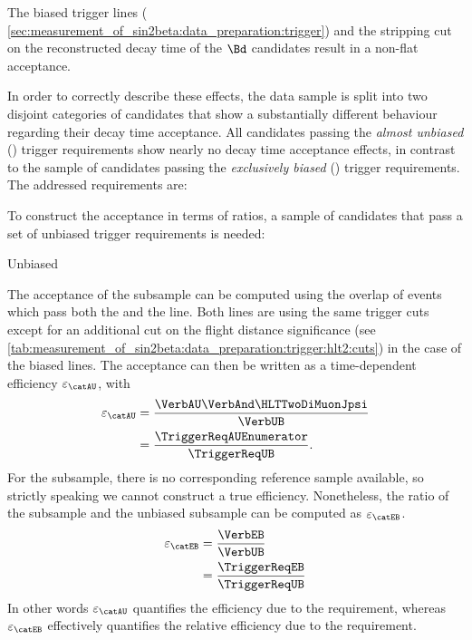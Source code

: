 The biased trigger lines (\cf
\cref{sec:measurement_of_sin2beta:data_preparation:trigger}) and the stripping
cut on the reconstructed decay time of the $\Bd$ candidates result in a non-flat
acceptance.

In order to correctly describe these effects, the data sample is split into two
disjoint categories of candidates that show a substantially different behaviour
regarding their decay time acceptance. All candidates passing the \emph{almost
unbiased} (\textbf{\catAU}) trigger requirements show nearly no decay time
acceptance effects, in contrast to the sample of candidates passing the
\emph{exclusively biased} (\textbf{\catEB}) trigger requirements. The addressed
requirements are:
%
\begin{description}
  \item[\catAU] \TriggerReqAU
  \item[\catEB] \TriggerReqEB
\end{description}
%
To construct the acceptance in terms of ratios, a sample of candidates that pass
a set of unbiased trigger requirements is needed:
%
\begin{description}
  \item[Unbiased] \TriggerReqUB
\end{description}
%
The acceptance of the \catAU subsample can be computed using the overlap of events
which pass both the \HLTTwoDiMuonDetachedJpsi and the
\HLTTwoDiMuonJpsi line. Both lines are using the same trigger cuts except for
an additional cut on the flight distance significance (see
\cref{tab:measurement_of_sin2beta:data_preparation:trigger:hlt2:cuts}) in the
case of the biased lines. The acceptance can then be written as a time-dependent
efficiency $\varepsilon_\text{\catAU}$, with
%
\begin{equation}
  \begin{split}
    \varepsilon_\text{\catAU} &= \frac{\VerbAU \VerbAnd \HLTTwoDiMuonJpsi}{\VerbUB}\\
                              &= \frac{\TriggerReqAUEnumerator}{\TriggerReqUB}.
  \end{split}
\end{equation} 
%
For the \catEB subsample, there is no corresponding reference sample available, so
strictly speaking we cannot construct a true efficiency. Nonetheless, the ratio
of the \catEB subsample and the unbiased subsample can be computed as
$\varepsilon_\text{\catEB}$.
%
\begin{equation}
  \begin{split}
    \varepsilon_\text{\catEB} &= \frac{\VerbEB}{\VerbUB}\\
                              &= \frac{\TriggerReqEB}{\TriggerReqUB}
  \end{split}
\end{equation}
%
In other words $\varepsilon_\text{\catAU}$ quantifies the efficiency due to the
\HLTTwoDiMuonDetachedJpsi requirement, whereas $\varepsilon_\text{\catEB}$
effectively quantifies the relative efficiency due to the \HLTOneTrackMuon
requirement.

